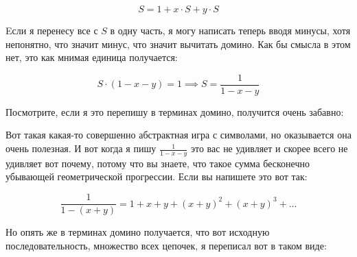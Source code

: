 \documentclass[russian]{lecture-notes}
\theoremstyle{definition}
\begin{document}
\begin{enumerate}
		\[
		S = 1 + x \cdot S + y \cdot S
		\]
		
		Eсли я перенесу все с $S$ в одну часть, я могу написать теперь вводя минусы, хотя непонятно, что значит минус, что значит вычитать домино. Как бы смысла в этом нет, это как мнимая единица получается:
		
		\[
			S \cdot (1 - x - y) = 1 \implies S = \frac{1}{1 - x - y}
		\]
		
		Посмотрите, если я это перепишу в терминах домино, получится очень забавно:
		
		\begin{figure}[H]
			\centering
		\end{figure}
	
		Вот такая какая-то совершенно абстрактная игра с символами, но оказывается она очень полезная. И вот когда я пишу $\frac{1}{1 - x - y}$ это вас не удивляет и скорее всего не удивляет вот почему, потому что вы знаете, что такое сумма бесконечно убывающей геометрической прогрессии. Если вы напишете это вот так:
		
		\[
			\frac{1}{1 - (x + y)} = 1 + x + y + (x + y)^2 + (x + y)^3 + \ldots
		\]
		
		Но опять же в терминах домино получается, что вот исходную последовательность, множество всех цепочек, я переписал вот в таком виде:
		
		\begin{figure}[H]
			\centering
\end{figure}
\end{enumerate}
\end{document}
